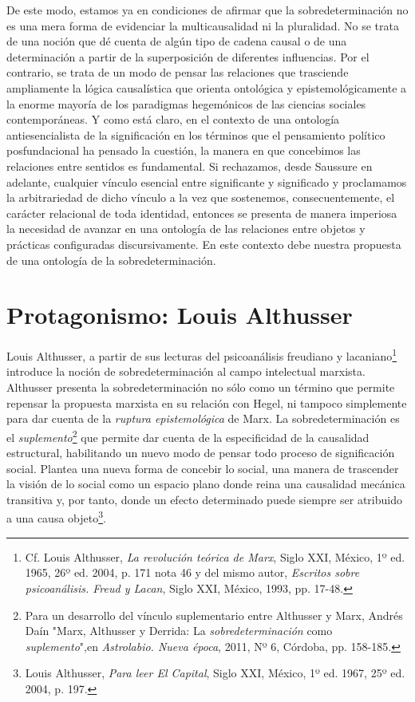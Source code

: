 \documentclass{book}
\begin{document}
De este modo, estamos ya en condiciones de afirmar que la
sobredeterminación no es una mera forma de evidenciar la multicausalidad
ni la pluralidad. No se trata de una noción que dé cuenta de algún tipo
de cadena causal o de una determinación a partir de la superposición de
diferentes influencias. Por el contrario, se trata de un modo de pensar
las relaciones que trasciende ampliamente la lógica causalística que
orienta ontológica y epistemológicamente a la enorme mayoría de los
paradigmas hegemónicos de las ciencias sociales contemporáneas. Y como
está claro, en el contexto de una ontología antiesencialista de la
significación en los términos que el pensamiento político posfundacional
ha pensado la cuestión, la manera en que concebimos las relaciones entre
sentidos es fundamental. Si rechazamos, desde Saussure en adelante,
cualquier vínculo esencial entre significante y significado y
proclamamos la arbitrariedad de dicho vínculo a la vez que sostenemos,
consecuentemente, el carácter relacional de toda identidad, entonces se
presenta de manera imperiosa la necesidad de avanzar en una ontología de
las relaciones entre objetos y prácticas configuradas discursivamente.
En este contexto debe nuestra propuesta de una ontología de la
sobredeterminación.

\hypertarget{protagonismo-louis-althusser}{%
\section{Protagonismo: Louis Althusser}\label{protagonismo-louis-althusser}}

Louis Althusser, a partir de sus lecturas del psicoanálisis freudiano y
lacaniano\footnote{Cf. Louis Althusser, \emph{La revolución teórica de
  Marx}, Siglo XXI, México, 1º ed. 1965, 26º ed. 2004, p. 171 nota 46 y
  del mismo autor, \emph{Escritos sobre psicoanálisis. Freud y Lacan},
  Siglo XXI, México, 1993, pp. 17-48.} introduce la noción de
sobredeterminación al campo intelectual marxista. Althusser presenta la
sobredeterminación no sólo como un término que permite repensar la
propuesta marxista en su relación con Hegel, ni tampoco simplemente para
dar cuenta de la \emph{ruptura epistemológica} de Marx. La
sobredeterminación es el \emph{suplemento}\footnote{Para un desarrollo
  del vínculo suplementario entre Althusser y Marx, Andrés Daín "Marx,
  Althusser y Derrida: La \emph{sobredeterminación} como
  \emph{suplemento}",en \emph{Astrolabio. Nueva época}, 2011, Nº 6,
  Córdoba, pp. 158-185.} que permite dar cuenta de la especificidad de
la causalidad estructural, habilitando un nuevo modo de pensar todo
proceso de significación social. Plantea una nueva forma de concebir lo
social, una manera de trascender la visión de lo social como un espacio
plano donde reina una causalidad mecánica transitiva y, por tanto, donde
un efecto determinado puede siempre ser atribuido a una causa
objeto\footnote{Louis Althusser, \emph{Para leer El Capital}, Siglo XXI,
  México, 1º ed. 1967, 25º ed. 2004, p. 197.}.
\end{document}
